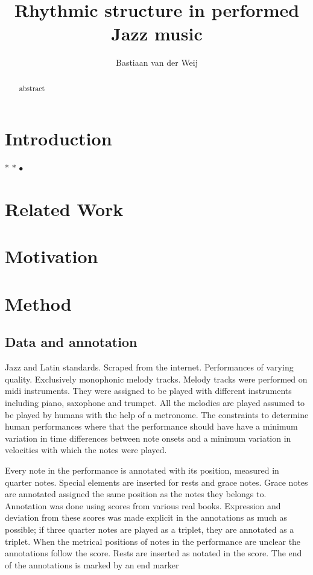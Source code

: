 \documentclass[a4paper,10pt]{article}
\title{Rhythmic structure in performed Jazz music}
\author{Bastiaan van der Weij}
\begin{document}
\maketitle
\begin{abstract}
abstract
\end{abstract}
\section{Introduction}
\label{sec:introduction}
* $*$  $\bullet$
\section{Related Work}
\label{sec:relatedwork}

\section{Motivation}
\label{sec:motivation}

\section{Method}
\label{sec:method}

\subsection{Data and annotation}

Jazz and Latin standards. Scraped from the internet. Performances of varying quality. Exclusively monophonic melody tracks. Melody tracks were performed on midi instruments. They were assigned to be played with different instruments including piano, saxophone and trumpet. All the melodies are played assumed to be played by humans with the help of a metronome. The constraints to determine human performances where that the performance should have have a minimum variation in time differences between note onsets and a minimum variation in velocities with which the notes were played.

Every note in the performance is annotated with its position, measured in quarter notes. Special elements are inserted for rests and grace notes. Grace notes are annotated assigned the same position as the notes they belongs to. Annotation was done using scores from various real books. Expression and deviation from these scores was made explicit in the annotations as much as possible; if three quarter notes are played as a triplet, they are annotated as a triplet. When the metrical positions of notes in the performance are unclear the annotations follow the score. Rests are inserted as notated in the score. The end of the annotations is marked by an end marker
\end{document}
